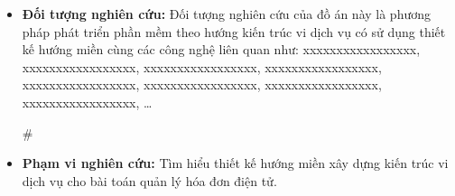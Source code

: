 \begin{itemize}

\item \textbf{Đối tượng nghiên cứu:} Đối tượng nghiên cứu của đồ án này là phương pháp phát triển phần mềm theo hướng kiến trúc vi dịch vụ có sử dụng thiết kế hướng miền cùng các công nghệ liên quan như: xxxxxxxxxxxxxxxxx, xxxxxxxxxxxxxxxxx, xxxxxxxxxxxxxxxxx, xxxxxxxxxxxxxxxxx, xxxxxxxxxxxxxxxxx, xxxxxxxxxxxxxxxxx, xxxxxxxxxxxxxxxxx, xxxxxxxxxxxxxxxxx, \dots

#

\item \textbf{Phạm vi nghiên cứu:} Tìm hiểu thiết kế hướng miền xây dựng kiến trúc vi dịch vụ cho bài toán quản lý hóa đơn điện tử.

\end{itemize}